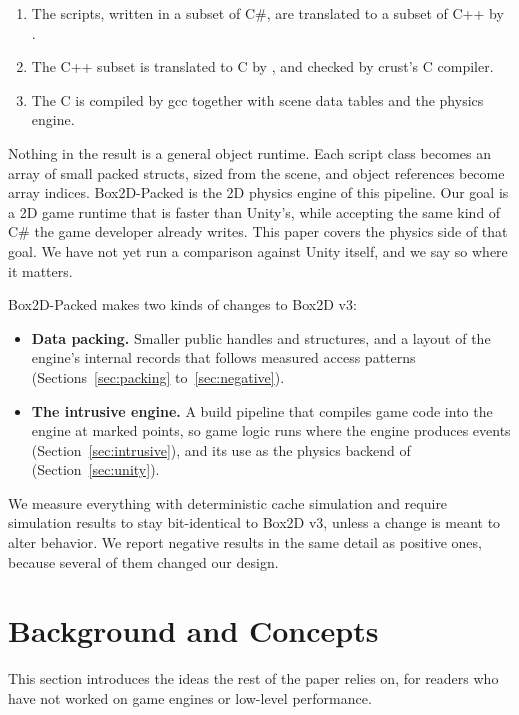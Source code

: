 \documentclass[11pt]{article}
\newcommand{\code}[1]{\texttt{\detokenize{#1}}}
\begin{document}
\begin{enumerate}[leftmargin=*,itemsep=2pt]
  \item The scripts, written in a subset of C\#, are translated to a subset of C++ by
        \code{cs2cpp}.
  \item The C++ subset is translated to C by \code{cpprust}, and checked by crust's C compiler.
  \item The C is compiled by gcc together with scene data tables and the physics engine.
\end{enumerate}

Nothing in the result is a general object runtime. Each script class becomes an array of small
packed structs, sized from the scene, and object references become array indices. Box2D-Packed is
the 2D physics engine of this pipeline. Our goal is a 2D game runtime that is faster than Unity's,
while accepting the same kind of C\# the game developer already writes. This paper covers the
physics side of that goal. We have not yet run a comparison against Unity itself, and we say so
where it matters.

Box2D-Packed makes two kinds of changes to Box2D v3:

\begin{itemize}[leftmargin=*,itemsep=2pt]
  \item \textbf{Data packing.} Smaller public handles and structures, and a layout of the engine's
        internal records that follows measured access patterns (Sections~\ref{sec:packing}
        to~\ref{sec:negative}).
  \item \textbf{The intrusive engine.} A build pipeline that compiles game code into the engine at
        marked points, so game logic runs where the engine produces events
        (Section~\ref{sec:intrusive}), and its use as the physics backend of \code{unity_pack}
        (Section~\ref{sec:unity}).
\end{itemize}

We measure everything with deterministic cache simulation and require simulation results to stay
bit-identical to Box2D v3, unless a change is meant to alter behavior. We report negative results
in the same detail as positive ones, because several of them changed our design.

\section{Background and Concepts}
\label{sec:background}

This section introduces the ideas the rest of the paper relies on, for readers who have not worked
on game engines or low-level performance.
\end{document}
